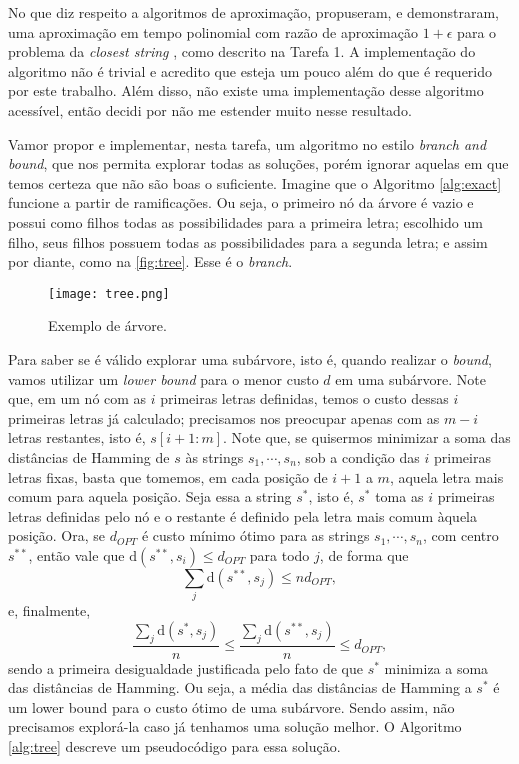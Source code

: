 No que diz respeito a algoritmos de aproximação, \citeauthor{li2002closest} propuseram, e demonstraram, uma aproximação em tempo polinomial com razão de aproximação $1 + \epsilon$ para o problema da \textit{closest string} \cite{li2002closest}, como descrito na Tarefa 1.
A implementação do algoritmo não é trivial e acredito que esteja um pouco além do que é requerido por este trabalho. Além disso, não existe uma implementação desse algoritmo acessível, então decidi por não me estender muito nesse resultado.

Vamor propor e implementar, nesta tarefa, um algoritmo no estilo \textit{branch and bound}, que nos permita explorar todas as soluções, porém ignorar aquelas em que temos certeza que não são boas o suficiente. Imagine que o Algoritmo \ref{alg:exact} funcione a partir de ramificações. Ou seja, o primeiro nó da árvore é vazio e possui como filhos todas as possibilidades para a primeira letra; escolhido um filho, seus filhos possuem todas as possibilidades para a segunda letra; e assim por diante, como na \autoref{fig:tree}. Esse é o \textit{branch}.

\begin{figure}[H]
    \centering
    \texttt{[image: tree.png]}
    \caption{Exemplo de árvore.}
    \label{fig:tree}
\end{figure}

Para saber se é válido explorar uma subárvore, isto é, quando realizar o \textit{bound}, vamos utilizar um \textit{lower bound} para o menor custo $d$ em uma subárvore. Note que, em um nó com as $i$ primeiras letras definidas, temos o custo dessas $i$ primeiras letras já calculado; precisamos nos preocupar apenas com as $m-i$ letras restantes, isto é, $s[i+1:m]$. Note que, se quisermos minimizar a soma das distâncias de Hamming de $s$ às strings $s_1, \cdots, s_n$, sob a condição das $i$ primeiras letras fixas, basta que tomemos, em cada posição de $i+1$ a $m$, aquela letra mais comum para aquela posição. Seja essa a string $s^\ast$, isto é, $s^\ast$ toma as $i$ primeiras letras definidas pelo nó e o restante é definido pela letra mais comum àquela posição. Ora, se $d_{OPT}$ é custo mínimo ótimo para as strings $s_1, \cdots, s_n$, com centro $s^{\ast\ast}$, então vale que $\text{d}(s^{\ast\ast}, s_i) \le d_{OPT}$ para todo $j$, de forma que
\[\sum_j \text{d}(s^{\ast\ast}, s_j) \le n d_{OPT},\]
e, finalmente,
\[\frac{\sum_j \text{d}(s^{\ast}, s_j)}{n} \le \frac{\sum_j \text{d}(s^{\ast\ast}, s_j)}{n} \le d_{OPT},\]
sendo a primeira desigualdade justificada pelo fato de que $s^\ast$ minimiza a soma das distâncias de Hamming.
Ou seja, a média das distâncias de Hamming a $s^\ast$ é um lower bound para o custo ótimo de uma subárvore. Sendo assim, não precisamos explorá-la caso já tenhamos uma solução melhor.
O Algoritmo \ref{alg:tree} descreve um pseudocódigo para essa solução.

